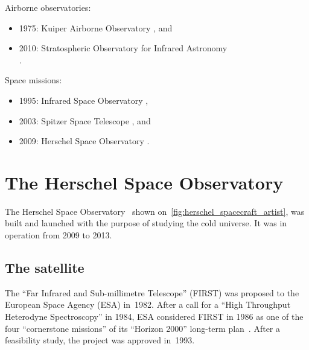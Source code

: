 \begin{samepage}
Airborne observatories:
\begin{itemize}[noitemsep]
    \item 1975: Kuiper Airborne Observatory                      \parencite{gillespie1981kuiper}, and
    \item 2010: Stratospheric Observatory for Infrared Astronomy\\ \parencite{becklin2012stratospheric}.
\end{itemize}
\end{samepage}

\begin{samepage}
Space missions:
\begin{itemize}[noitemsep]
    \item 1995: Infrared Space Observatory  \parencite{isoHandbook1},
    \item 2003: Spitzer Space Telescope     \parencite{werner2004spitzer}, and
    \item 2009: Herschel Space Observatory  \parencite{AA_518_L1}.
\end{itemize}
\end{samepage}



\FloatBarrier
\section{The Herschel Space Observatory}

The Herschel Space Observatory~\parencite{AA_518_L1}
shown on~\cref{fig:herschel_spacecraft_artist},
was built and launched with the purpose of studying the cold universe.
It was in operation from 2009 to 2013.


\subsection{The satellite}

The ``Far Infrared and Sub-millimetre Telescope'' (FIRST) was proposed to the European Space Agency (ESA) in~1982.
After a call for a ``High Throughput Heterodyne Spectroscopy'' in 1984,
ESA considered FIRST in 1986 as one of the four ``cornerstone missions'' of its ``Horizon 2000'' long-term plan~\parencite{pilbratt1997first}.
After a feasibility study, the project was approved in~1993.

